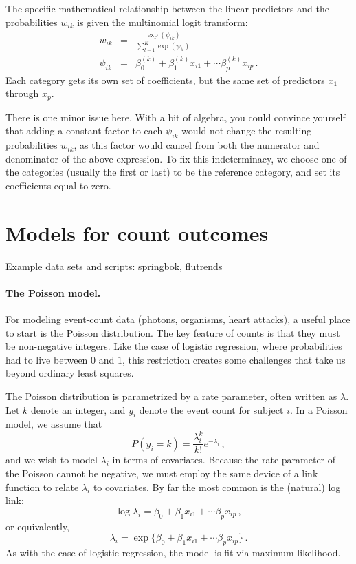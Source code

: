 \documentclass[11pt]{article}
\newcommand{\1}[1]{\mathbf{1}_{\{ {#1} \}}}
\begin{document}
The specific mathematical relationship between the linear predictors and the probabilities $w_{ik}$ is given the multinomial logit transform:
\begin{eqnarray*}
w_{ik} &=& \frac{\exp(\psi_{ik})}{ \sum_{l=1}^K \exp(\psi_{il}) } \\
\psi_{ik} &=& \beta_0^{(k)} + \beta_1^{(k)} x_{i1} + \cdots \beta_p^{(k)} x_{ip} \, .
\end{eqnarray*}
Each category gets its own set of coefficients, but the same set of predictors $x_1$ through $x_p$.

There is one minor issue here.  With a bit of algebra, you could convince yourself that adding a constant factor to each $\psi_{ik}$ would not change the resulting probabilities $w_{ik}$, as this factor would cancel from both the numerator and denominator of the above expression.  To fix this indeterminacy, we choose one of the categories (usually the first or last) to be the reference category, and set its coefficients equal to zero.


\section{Models for count outcomes}
Example data sets and scripts: springbok, flutrends

\paragraph{The Poisson model.}

For modeling event-count data (photons, organisms, heart attacks), a useful place to start is the Poisson distribution.  The key feature of counts is that they must be non-negative integers.  Like the case of logistic regression, where probabilities had to live between $0$ and $1$, this restriction creates some challenges that take us beyond ordinary least squares.

The Poisson distribution is parametrized by a rate parameter, often written as $\lambda$.  Let $k$ denote an integer, and $y_i$ denote the event count for subject $i$.  In a Poisson model, we assume that
$$
P(y_i = k) = \frac{\lambda_i^k}{k!} e^{-\lambda_i} \, ,
$$
and we wish to model $\lambda_i$ in terms of covariates.  Because the rate parameter of the Poisson cannot be negative, we must employ the same device of a link function to relate $\lambda_i$ to covariates.  By far the most common is the (natural) log link:
$$
\log \lambda_i = \beta_0 + \beta_1 x_{i1} + \cdots \beta_p x_{ip} \, ,
$$
or equivalently,
$$
 \lambda_i = \exp \{ \beta_0 + \beta_1 x_{i1} + \cdots \beta_p x_{ip} \} \, .
$$
As with the case of logistic regression, the model is fit via maximum-likelihood.
\end{document}
